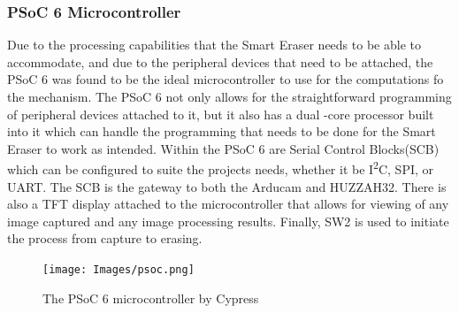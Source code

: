  \subsubsection{PSoC 6 Microcontroller}
 Due to the processing capabilities that the Smart Eraser needs to be able to accommodate, and due to the peripheral devices that need to be attached, the PSoC 6 was found to be the ideal microcontroller to use for the computations fo the mechanism. The PSoC 6 not only allows for the straightforward programming of peripheral devices attached to it, but it also has a dual -core processor built into it which can handle the programming that needs to be done for the Smart Eraser to work as intended. Within the PSoC 6 are Serial Control Blocks(SCB) which can be configured to suite the projects needs, whether it be I\textsuperscript{2}C, SPI, or UART. The SCB is the gateway to both the Arducam and HUZZAH32. There is also a TFT display attached to the microcontroller that allows for viewing of any image captured and any image processing results. Finally, SW2 is used to initiate the process from capture to erasing.
    \begin{figure}[H]
 	\centering
 	{\texttt{[image: Images/psoc.png]}}
 	\caption{The PSoC 6 microcontroller by Cypress}
 	\label{fig:psoc}
 \end{figure}
 
